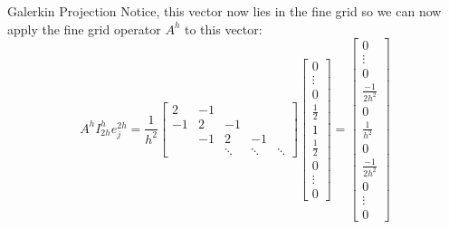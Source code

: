 \documentclass[11pt]{beamer}
\begin{document}
\begin{frame}{Galerkin Projection}
  Notice, this vector now lies in the fine grid so we can now apply the
  fine grid operator \(A^h\) to this vector:
  \begin{equation*}
    A^h I_{2h}^h e_j^{2h} =
    \frac{1}{h^2}
    \begin{bmatrix}
      2 & -1  &    &    & \\
      -1 & 2  & -1 &    & \\
      & -1 & 2  & -1 &  \\
      &    & \ddots & \ddots & \ddots
    \end{bmatrix}
    \begin{bmatrix}
      0 \\ \vdots \\ 0 \\ \frac{1}{2} \\ 1 \\ \frac{1}{2} \\ 0 \\ \vdots \\ 0
    \end{bmatrix} 
    = \begin{bmatrix}
      0 \\ \vdots \\ 0 \\ \frac{-1}{2h^2} \\ 0 \\ \frac{1}{h^2} \\ 0 \\ \frac{-1}{2h^2} \\ 0 \\ \vdots \\ 0
    \end{bmatrix}
  \end{equation*}
\end{frame}
\end{document}
